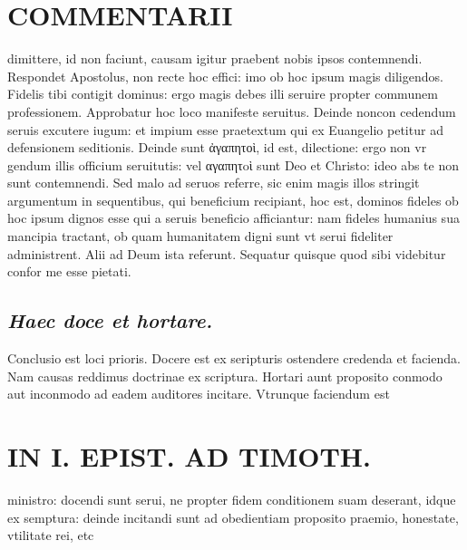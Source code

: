 \documentclass{article}
\begin{document}
\begin{pages}
\section*{COMMENTARII }
\marginpar{[ p.148 ]}\pstart dimittere, id non faciunt, causam igitur praebent nobis ipsos contemnendi. Respondet Apostolus, non recte hoc effici: imo ob hoc ipsum magis diligendos. Fidelis tibi contigit dominus: ergo magis debes illi seruire propter communem professionem. Approbatur hoc loco manifeste seruitus. Deinde noncon cedendum seruis excutere iugum: et impium esse praetextum qui ex Euangelio petitur ad defensionem seditionis. Deinde sunt ἀγαπητοὶ, id est, dilectione: ergo non vr gendum illis officium seruitutis: vel αγαπητoὶ sunt Deo et Christo: ideo abs te non sunt contemnendi. Sed malo ad seruos referre, sic enim magis illos stringit argumentum in sequentibus, qui beneficium recipiant, hoc est, dominos fideles ob hoc ipsum dignos esse qui a seruis beneficio afficiantur: nam fideles humanius sua mancipia tractant, ob quam humanitatem digni sunt vt serui fideliter administrent. Alii ad Deum ista referunt. Sequatur quisque quod sibi videbitur confor me esse pietati.  \pend
{}
{}
\subsection*{\textit{Haec doce et hortare. }}\pstart Conclusio est loci prioris. Docere est ex seripturis ostendere credenda et facienda. Nam causas reddimus doctrinae ex scriptura. Hortari aunt proposito conmodo aut inconmodo ad eadem auditores incitare. Vtrunque faciendum est  \pend
\section*{IN I. EPIST. AD TIMOTH. }
\marginpar{[ p.149 ]}\pstart ministro: docendi sunt serui, ne propter fidem conditionem suam deserant, idque ex semptura: deinde incitandi sunt ad obedientiam proposito praemio, honestate, vtilitate rei, etc  \pend
{}
{}

\end{pages}
\end{document}
